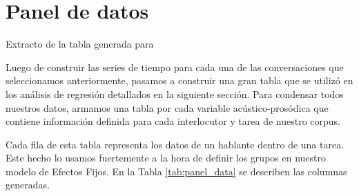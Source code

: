 \section{Panel de datos}
\label{sec:panel_data}


\begin{table}[t]
\centering

\caption{Extracto de la tabla generada para \FOMEAN}
\label{tab:panel_data_example}
\end{table}


Luego de construir las series de tiempo para cada una de las conversaciones que seleccionamos anteriormente, pasamos a construir una gran tabla que se utilizó en los análisis de regresión detallados en la siguiente sección. Para condensar todos nuestros datos, armamos una tabla por cada variable acústico-prosódica que contiene información definida para cada interlocutor y tarea de nuestro corpus.

Cada fila de esta tabla representa los datos de un hablante dentro de una tarea. Este hecho lo usamos fuertemente a la hora de definir los grupos en nuestro modelo de Efectos Fijos. En la Tabla \ref{tab:panel_data} se describen las columnas generadas.


